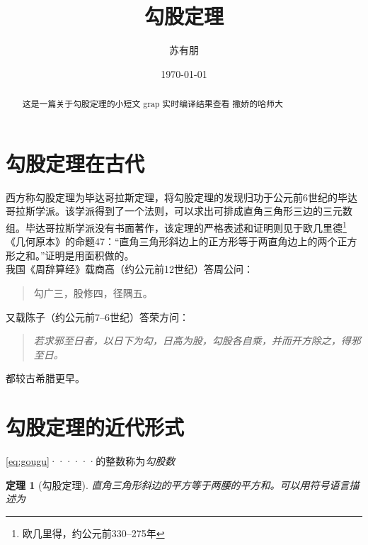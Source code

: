 \documentclass[12pt]{ctexart}
\title{勾股定理}
\author{\kaishu \zihao{3} 苏有朋}
\date{\today}
\newtheorem{thm}{定理}
\newenvironment{myquote}{\begin{quote}\kaishu\zihao{4}}{\end{quote}}
\begin{document}
	\maketitle
	\begin{abstract}
		这是一篇关于勾股定理的小短文
		grap
		实时编译结果查看
		撒娇的哈师大
	\end{abstract}
	\newpage
	
	\tableofcontents
	\newpage
	
	\section{勾股定理在古代}
	西方称勾股定理为毕达哥拉斯定理，将勾股定理的发现归功于公元前6世纪的毕达哥拉斯学派\cite{Kline}。该学派得到了一个法则，可以求出可排成直角三角形三边的三元数组。毕达哥拉斯学派没有书面著作，该定理的严格表述和证明则见于欧几里德\footnote{欧几里得，约公元前330--275年}《几何原本》的命题47：“直角三角形斜边上的正方形等于两直角边上的两个正方形之和。”证明是用面积做的。\\
	
	我国《周辞算经》载商高（约公元前12世纪）答周公问：
	\begin{myquote}
		勾广三，股修四，径隅五。
	\end{myquote}%

	又载陈子（约公元前7--6世纪）答荣方问：\cite{quanjing}
	\begin{quote}
		\emph{若求邪至日者，以日下为勾，日高为股，勾股各自乘，并而开方除之，得邪至日。}
	\end{quote}
	都较古希腊更早。
	\newpage
	
	\section{勾股定理的近代形式}
	\eqref{eq:gougu}······的整数称为\emph{勾股数}\\%
	
	\begin{thm}[勾股定理]
		直角三角形斜边的平方等于两腰的平方和。可以用符号语言描述为
	\end{thm}
\end{document}
